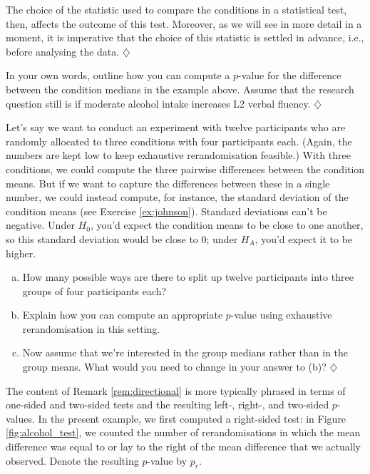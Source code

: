 \documentclass[a4paper]{tufte-book}\usepackage[]{graphicx}\usepackage[]{xcolor}
\newcommand*{\parend}[1][$\diamondsuit$]{%
  \unskip\nobreak\hspace{1em plus 1fill}$\diamondsuit$%
}
\begin{document}
  The choice of the statistic used to compare the conditions in a
  statistical test, then, affects the outcome of this test.
  Moreover, as we will see in more detail in a moment, it is imperative
  that the choice of this statistic is settled in advance, i.e.,
  before analysing the data.
\parend

  In your own words, 
  outline how you can compute a $p$-value for the difference 
  between the condition medians in the example above.
  Assume that the research question still is if moderate alcohol intake
  increases L2 verbal fluency.
\parend

  Let's say we want to conduct an experiment with
  twelve participants who are randomly allocated to
  three conditions with four participants each.
  (Again, the numbers are kept low to keep exhaustive
  rerandomisation feasible.)
  With three conditions, we could compute the 
  three pairwise differences between the condition means.
  But if we want to capture the differences between
  these in a single number, we could instead compute,
  for instance, the standard deviation of the condition means
  (see Exercise \vref{ex:johnson}).
  Standard deviations can't be negative.
  Under $H_0$, you'd expect the condition means to be close to one another,
  so this standard deviation would be close to $0$; 
  under $H_A$, you'd expect it to be higher.
  \begin{enumerate}[(a)]
    \item How many possible ways are there to split up 
    twelve participants into three groups of four participants each?
    \item Explain how you can compute an appropriate $p$-value using
    exhaustive rerandomisation in this setting.
    \item Now assume that we're interested in the group medians rather 
    than in the group means. 
    What would you need to change in your answer to (b)?\parend
  \end{enumerate}
  
  The content of Remark \ref{rem:directional} is more typically phrased
  in terms of one-sided and two-sided tests
  and the resulting left-, right-, and two-sided $p$-values.
  In the present example, we first computed a right-sided test:
  in Figure \ref{fig:alcohol_test}, we counted the number of 
  rerandomisations in which the mean difference was equal to
  or lay to the right of the mean difference that we actually observed.
  Denote the resulting $p$-value by $p_r$.
  
\end{document}
